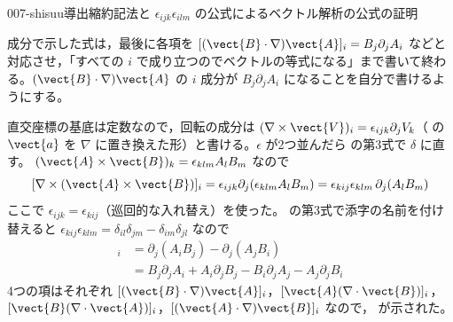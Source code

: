 \documentclass[uplatex,dvipdfmx,a4paper,11pt]{jsarticle}
\begin{document}
\begin{mondai}{007-shisuu}{導出}{縮約記法と $\epsilon_{ijk}\epsilon_{ilm}$ の公式によるベクトル解析の公式の証明}
\begin{kizuki}
\item 成分で示した式は，最後に各項を $[(\vect{B}\cdot\nabla)\vect{A}]_{i}=B_{j}\partial_{j}A_{i}$ などと対応させ，「すべての $i$ で成り立つのでベクトルの等式になる」まで書いて終わる。$(\vect{B}\cdot\nabla)\vect{A}$ の $i$ 成分が $B_{j}\partial_{j}A_{i}$ になることを自分で書けるようにする。
\end{kizuki}
\begin{tadashii}
\houshin 直交座標の基底は定数なので，回転の成分は $(\nabla\times\vect{V})_i = \epsilon_{ijk}\partial_jV_k$（ の $\vect{a}$ を $\nabla$ に置き換えた形）と書ける。$\epsilon$ が2つ並んだら  の第3式で $\delta$ に直す。
\keisan {} $(\vect{A}\times\vect{B})_k = \epsilon_{klm}A_lB_m$ なので
\[ [\nabla\times(\vect{A}\times\vect{B})]_i = \epsilon_{ijk}\partial_j(\epsilon_{klm}A_lB_m) = \epsilon_{kij}\epsilon_{klm}\,\partial_j(A_lB_m) \]
ここで $\epsilon_{ijk} = \epsilon_{kij}$（巡回的な入れ替え）を使った。 の第3式で添字の名前を付け替えると $\epsilon_{kij}\epsilon_{klm} = \delta_{il}\delta_{jm} - \delta_{im}\delta_{jl}$ なので
\begin{align*}
  [\nabla\times(\vect{A}\times\vect{B})]_i &= \partial_j(A_iB_j) - \partial_j(A_jB_i) \\
  &= B_j\partial_jA_i + A_i\partial_jB_j - B_i\partial_jA_j - A_j\partial_jB_i
\end{align*}
4つの項はそれぞれ $[(\vect{B}\cdot\nabla)\vect{A}]_i$，$[\vect{A}(\nabla\cdot\vect{B})]_i$，$[\vect{B}(\nabla\cdot\vect{A})]_i$，$[(\vect{A}\cdot\nabla)\vect{B}]_i$ なので， が示された。


\end{tadashii}
\end{mondai}
\end{document}
